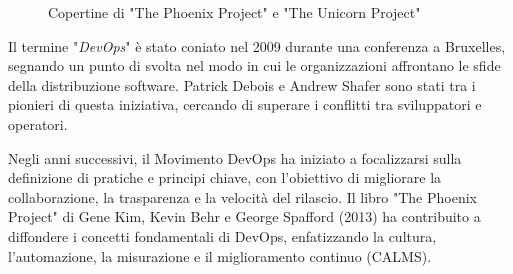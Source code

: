 \begin{figure}[h]
    \centering
    \hspace{30px}
    \caption{Copertine di "The Phoenix Project" e "The Unicorn Project"}
    \label{fig:cha1:jerez}
\end{figure}

Il termine "{\em DevOps}" è stato coniato nel 2009 durante una conferenza a Bruxelles, segnando un punto di svolta nel modo in cui le organizzazioni affrontano le sfide della distribuzione software. Patrick Debois e Andrew Shafer sono stati tra i pionieri di questa iniziativa, cercando di superare i conflitti tra sviluppatori e operatori.

Negli anni successivi, il Movimento DevOps ha iniziato a focalizzarsi sulla definizione di pratiche e principi chiave, con l'obiettivo di migliorare la collaborazione, la trasparenza e la velocità del rilascio. Il libro "The Phoenix Project" \cite{phoenix} di Gene Kim, Kevin Behr e George Spafford (2013) ha contribuito a diffondere i concetti fondamentali di DevOps, enfatizzando la cultura, l'automazione, la misurazione e il miglioramento continuo (CALMS).

